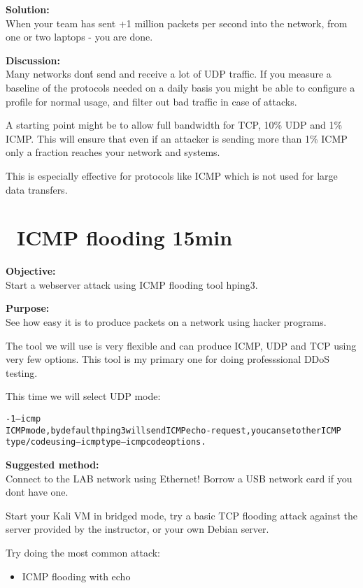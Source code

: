 \documentclass[a4paper,11pt,notitlepage]{report}
\begin{document}
{\bf Solution:}\\
When your team has sent +1 million packets per second into the network, from one or two laptops - you are done.

{\bf Discussion:}\\
Many networks don\'t send and receive a lot of UDP traffic. If you measure a baseline of the protocols needed on a daily basis you might be able to configure a profile for normal usage, and filter out bad traffic in case of attacks.

A starting point might be to allow full bandwidth for TCP, 10\% UDP and 1\% ICMP. This will ensure that even if an attacker is sending more than 1\% ICMP only a fraction reaches your network and systems.

This is especially effective for protocols like ICMP which is not used for large data transfers.

\chapter{\faInfoCircle\ ICMP flooding 15min}

{\bf Objective:}\\
Start a webserver attack using ICMP flooding tool hping3.

{\bf Purpose:}\\
See how easy it is to produce packets on a network using hacker programs.

The tool we will use is very flexible and can produce ICMP, UDP and TCP using very few options. This tool is my primary one for doing professsional DDoS testing.

This time we will select UDP mode:

\begin{alltt}\footnotesize
-1 --icmp
       ICMP  mode,  by  default  hping3  will  send  ICMP echo-request, you can set other ICMP
       type/code using --icmptype --icmpcode options.
\end{alltt}

{\bf Suggested method:}\\
Connect to the LAB network using Ethernet! Borrow a USB network card if you dont have one.

Start your Kali VM in bridged mode, try a basic TCP flooding attack against the server provided by the instructor, or your own Debian server.

Try doing the most common attack:
\begin{itemize}
\item ICMP flooding with echo
\end{itemize}
\end{document}
